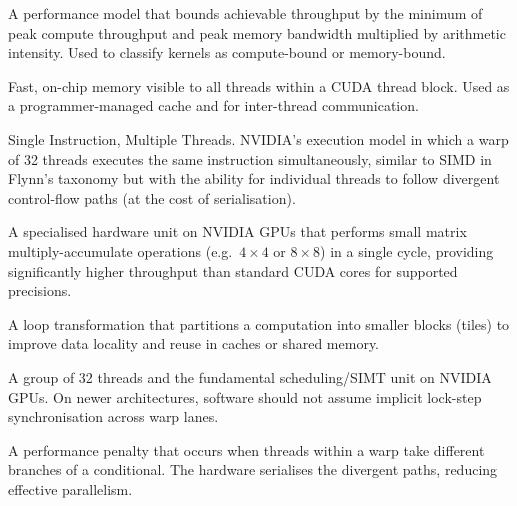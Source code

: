 \begin{description}[style=nextline, leftmargin=3.5cm, labelwidth=3.2cm]
  \item[Roofline model]
    A performance model that bounds achievable throughput by the minimum of peak compute throughput and peak memory bandwidth multiplied by arithmetic intensity. Used to classify kernels as compute-bound or memory-bound.

  \item[Shared memory]
    Fast, on-chip memory visible to all threads within a CUDA thread block. Used as a programmer-managed cache and for inter-thread communication.

  \item[SIMT]
    Single Instruction, Multiple Threads. NVIDIA's execution model in which a warp of 32 threads executes the same instruction simultaneously, similar to SIMD in Flynn's taxonomy but with the ability for individual threads to follow divergent control-flow paths (at the cost of serialisation).

  \item[Tensor core]
    A specialised hardware unit on NVIDIA GPUs that performs small matrix multiply-accumulate operations (e.g.\ $4 \times 4$ or $8 \times 8$) in a single cycle, providing significantly higher throughput than standard CUDA cores for supported precisions.

  \item[Tiling]
    A loop transformation that partitions a computation into smaller blocks (tiles) to improve data locality and reuse in caches or shared memory.

  \item[Warp]
    A group of 32 threads and the fundamental scheduling/SIMT unit on NVIDIA
    GPUs. On newer architectures, software should not assume implicit
    lock-step synchronisation across warp lanes.

  \item[Warp divergence]
    A performance penalty that occurs when threads within a warp take different branches of a conditional. The hardware serialises the divergent paths, reducing effective parallelism.

\end{description}
